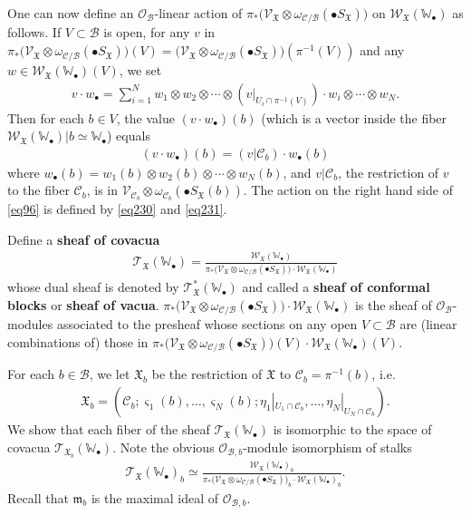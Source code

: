\documentclass[12pt,b5paper,notitlepage]{report}
\theoremstyle{definition}
\theoremstyle{plain}
\newcommand{\fk}{\mathfrak}
\newcommand{\mc}{\mathcal}
\newcommand{\wtd}{\widetilde}
\newcommand{\scr}{\mathscr}
\newcommand{\sgm}{\varsigma}
\newcommand{\blt}{\bullet}
\newcommand{\Wbb}{\mathbb W}
\numberwithin{equation}{section}
\begin{document}
One can now define an $\scr O_{\mc B}$-linear action of $\pi_*\big(\scr V_{\fk X}\otimes\omega_{\mc C/\mc B}(\blt S_{\fk X})\big)$ on $\scr W_{\fk X}(\Wbb_\blt)$ as follows. If $V\subset\mc B$ is open, for any $v$ in $\pi_*\big(\scr V_{\fk X}\otimes\omega_{\mc C/\mc B}(\blt S_{\fk X})\big)(V)=\big(\scr V_{\fk X}\otimes\omega_{\mc C/\mc B}(\blt S_{\fk X})\big)(\pi^{-1}(V))$ and any $w\in\scr W_{\fk X}(\Wbb_\blt)(V)$, we set
\begin{align}
v\cdot w_\blt=\sum_{i=1}^N w_1\otimes w_2\otimes\cdots \otimes (v|_{U_i\cap\pi^{-1}(V)})\cdot w_i \otimes\cdots\otimes w_N.\label{eq152}
\end{align}
Then for each $b\in V$, the value $(v\cdot w_\blt)(b)$ (which is a vector inside the fiber $\scr W_{\fk X}(\Wbb_\blt)|b\simeq \Wbb_\blt$) equals
\begin{align}
(v\cdot w_\blt)(b)=(v|{\mc C_b})\cdot w_\blt(b)\label{eq96}
\end{align}
where $w_\blt(b)=w_1(b)\otimes w_2(b)\otimes\cdots\otimes w_N(b)$, and $v|{\mc C_b}$, the restriction of $v$ to the fiber $\mc C_b$, is in $\scr V_{\mc C_b}\otimes\omega_{\mc C_b}(\blt S_{\fk X}(b))$. The action on the right hand side of \eqref{eq96} is defined by \eqref{eq230} and \eqref{eq231}.

Define a \textbf{sheaf of covacua} \index{T@$\scr T_{\fk X}(\Wbb_\blt),\scr T_{\fk X}^*(\Wbb_\blt)$}
\begin{gather}
\scr T_{\fk X}(\Wbb_\blt)=\frac{\scr W_{\fk X}(\Wbb_\blt)}{\pi_*\big(\scr V_{\fk X}\otimes\omega_{\mc C/\mc B}(\blt S_{\fk X})\big)\cdot \scr W_{\fk X}(\Wbb_\blt)}\label{eq99}
\end{gather}
whose dual sheaf is denoted by $\scr T_{\fk X}^*(\Wbb_\blt)$ and called a \textbf{sheaf of conformal blocks} or \textbf{sheaf of vacua}. $\pi_*\big(\scr V_{\fk X}\otimes\omega_{\mc C/\mc B}(\blt S_{\fk X})\big)\cdot \scr W_{\fk X}(\Wbb_\blt)$ is the sheaf of $\scr O_{\mc B}$-modules associated to the presheaf whose sections on any open $V\subset\mc B$ are (linear combinations of) those in $\pi_*\big(\scr V_{\fk X}\otimes\omega_{\mc C/\mc B}(\blt S_{\fk X})\big)(V)\cdot \scr W_{\fk X}(\Wbb_\blt)(V)$. 

For each $b\in\mc B$, we let $\fk X_b$ be the restriction of $\fk X$ to $\mc C_b=\pi^{-1}(b)$, i.e. \index{XX@$\wtd {\fk X}$ and $\fk X$!$\fk X_b$}
\begin{align*}
\fk X_b=(\mc C_b;\sgm_1(b),\dots,\sgm_N(b);\eta_1|_{U_1\cap\mc C_b},\dots,\eta_N|_{U_N\cap\mc C_b}).
\end{align*}
We show that each fiber of the sheaf $\scr T_{\fk X}(\Wbb_\blt)$ is isomorphic to the space of covacua $\scr T_{\fk X_b}(\Wbb_\blt)$. Note the obvious $\scr O_{\mc B,b}$-module isomorphism of  stalks
\begin{gather}
\scr T_{\fk X}(\Wbb_\blt)_b\simeq \frac{\scr W_{\fk X}(\Wbb_\blt)_b}{\pi_*\big(\scr V_{\fk X}\otimes\omega_{\mc C/\mc B}(\blt S_{\fk X})\big)_b\cdot \scr W_{\fk X}(\Wbb_\blt)_b}.\label{eq95}
\end{gather}
Recall that $\fk m_b$ is the maximal ideal of $\scr O_{\mc B,b}$.
\end{document}
